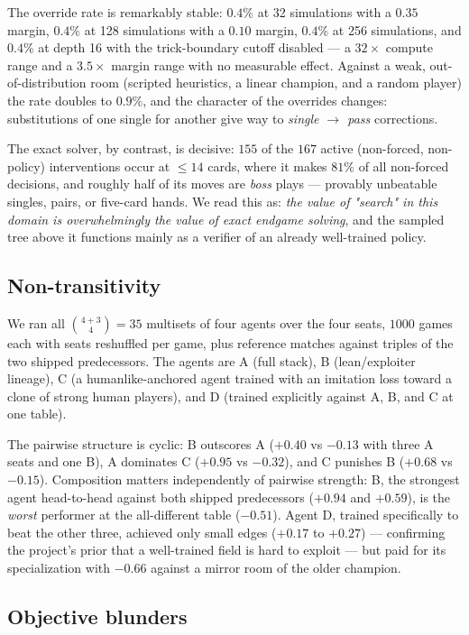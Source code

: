 \documentclass[11pt]{article}
\begin{document}
The override rate is remarkably stable: $0.4\%$ at 32 simulations with
a $0.35$ margin, $0.4\%$ at 128 simulations with a $0.10$ margin,
$0.4\%$ at 256 simulations, and $0.4\%$ at depth 16 with the
trick-boundary cutoff disabled --- a $32\times$ compute range and a
$3.5\times$ margin range with no measurable effect. Against a weak,
out-of-distribution room (scripted heuristics, a linear champion, and a
random player) the rate doubles to $0.9\%$, and the character of the
overrides changes: substitutions of one single for another give way to
\emph{single $\rightarrow$ pass} corrections.

The exact solver, by contrast, is decisive: $155$ of the $167$ active
(non-forced, non-policy) interventions occur at $\leq 14$ cards, where
it makes $81\%$ of all non-forced decisions, and roughly half of its
moves are \emph{boss} plays --- provably unbeatable singles, pairs, or
five-card hands. We read this as: \emph{the value of "search" in this
domain is overwhelmingly the value of exact endgame solving}, and the
sampled tree above it functions mainly as a verifier of an already
well-trained policy.

\subsection{Non-transitivity}

We ran all $\binom{4+3}{4} = 35$ multisets of four agents over the four
seats, $1000$ games each with seats reshuffled per game, plus reference
matches against triples of the two shipped predecessors. The agents are
A (full stack), B (lean/exploiter lineage), C (a humanlike-anchored
agent trained with an imitation loss toward a clone of strong human
players), and D (trained explicitly against A, B, and C at one table).

The pairwise structure is cyclic: B outscores A ($+0.40$ vs $-0.13$
with three A seats and one B), A dominates C ($+0.95$ vs $-0.32$),
and C punishes B ($+0.68$ vs $-0.15$). Composition matters
independently of pairwise strength: B, the strongest agent
head-to-head against both shipped predecessors ($+0.94$ and $+0.59$),
is the \emph{worst} performer at the all-different table
($-0.51$). Agent D, trained specifically to beat the other three,
achieved only small edges ($+0.17$ to $+0.27$) --- confirming the
project's prior that a well-trained field is hard to exploit --- but
paid for its specialization with $-0.66$ against a mirror room of the
older champion.

\subsection{Objective blunders}
\end{document}
